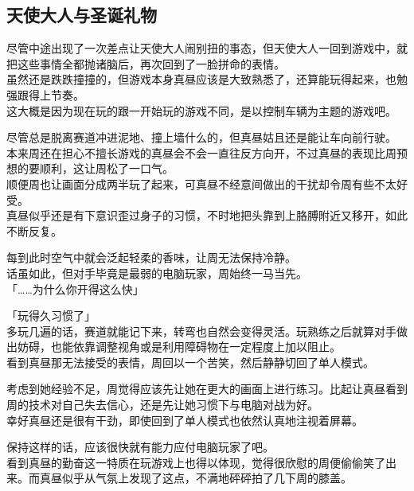 \subsection{天使大人与圣诞礼物}

尽管中途出现了一次差点让天使大人闹别扭的事态，但天使大人一回到游戏中，就把这些事情全都抛诸脑后，再次回到了一脸拼命的表情。\\

虽然还是跌跌撞撞的，但游戏本身真昼应该是大致熟悉了，还算能玩得起来，也勉强跟得上节奏。\\

这大概是因为现在玩的跟一开始玩的游戏不同，是以控制车辆为主题的游戏吧。

尽管总是脱离赛道冲进泥地、撞上墙什么的，但真昼姑且还是能让车向前行驶。\\

本来周还在担心不擅长游戏的真昼会不会一直往反方向开，不过真昼的表现比周预想的要顺利，这让周松了一口气。\\

顺便周也让画面分成两半玩了起来，可真昼不经意间做出的干扰却令周有些不太好受。\\

真昼似乎还是有下意识歪过身子的习惯，不时地把头靠到上胳膊附近又移开，如此不断反复。

每到此时空气中就会泛起轻柔的香味，让周无法保持冷静。\\

话虽如此，但对手毕竟是最弱的电脑玩家，周始终一马当先。\\

「……为什么你开得这么快」

「玩得久习惯了」\\

多玩几遍的话，赛道就能记下来，转弯也自然会变得灵活。玩熟练之后就算对手做出妨碍，也能依靠调整视角或是利用障碍物在一定程度上加以阻止。\\

看到真昼那无法接受的表情，周回以一个苦笑，然后静静切回了单人模式。

考虑到她经验不足，周觉得应该先让她在更大的画面上进行练习。比起让真昼看到周的技术对自己失去信心，还是先让她习惯下与电脑对战为好。\\

幸好真昼还是很有干劲，即使回到了单人模式也依然认真地注视着屏幕。

保持这样的话，应该很快就有能力应付电脑玩家了吧。\\

看到真昼的勤奋这一特质在玩游戏上也得以体现，觉得很欣慰的周便偷偷笑了出来。而真昼似乎从气氛上发现了这点，不满地砰砰拍了几下周的膝盖。

